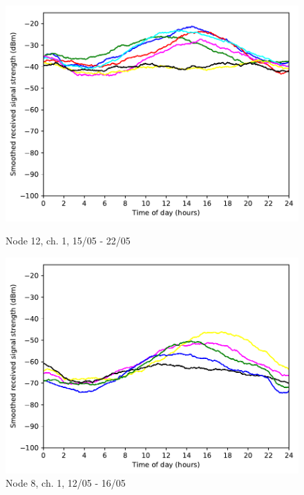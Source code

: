 \documentclass[a4paper, 11pt]{article}
\begin{document}
\begin{figure}
\begin{minipage}{0.47\textwidth}
    \centering
	\includegraphics[width=\textwidth]{images/2_4_GHz/cot-node12-student_2017-05-22_chan1_image}
    \caption{Node 12, ch. 1, 15/05 - 22/05} \label{node12-1}
\end{minipage}\hfill
\begin{minipage}{0.47\textwidth}
    \centering
	\includegraphics[width=\textwidth]{images/2_4_GHz/cot-node8-student_2017-05-16_chan1_image}
    \caption{Node 8, ch. 1, 12/05 - 16/05} \label{node8-1}
\end{minipage}\hfill


\end{figure}
\end{document}

